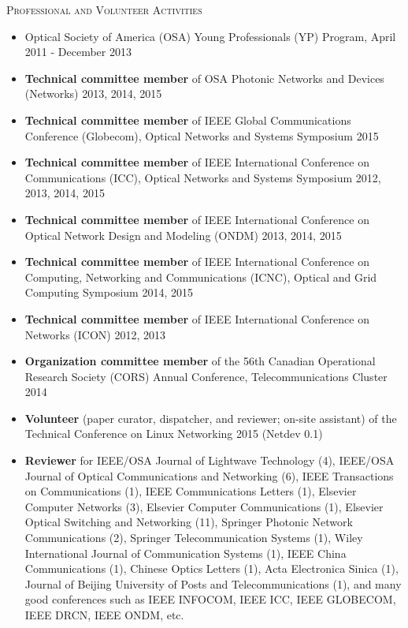 \documentclass[letterpaper,11pt]{article}
\newcommand{\resheading}[1]{{\noindent\large \colorbox{mygrey}{
\begin{minipage}{1.0\textwidth}{\textsc{#1 \vphantom{p\^{E}}}}\end{minipage}}}}
\begin{document}
\resheading{Professional and Volunteer Activities}%
\begin{itemize}
\setlength{\itemindent}{-0.075in}


\item
Optical Society of America (OSA) Young Professionals (YP) Program, April 2011 - December 2013

\item
\textbf{Technical committee member} of OSA Photonic Networks and Devices (Networks) 2013, 2014, 2015

\item
\textbf{Technical committee member} of IEEE Global Communications Conference (Globecom), Optical Networks and Systems Symposium 2015

\item
\textbf{Technical committee member} of IEEE International Conference on Communications (ICC), Optical Networks and Systems Symposium 2012, 2013, 2014, 2015

\item
\textbf{Technical committee member} of IEEE International Conference on Optical Network Design and Modeling (ONDM) 2013, 2014, 2015

\item
\textbf{Technical committee member} of IEEE International Conference on Computing, Networking and Communications (ICNC), Optical and Grid Computing Symposium 2014, 2015

\item
\textbf{Technical committee member} of IEEE International Conference on Networks (ICON) 2012, 2013

\item
\textbf{Organization committee member} of the 56th Canadian Operational Research Society (CORS) Annual Conference, Telecommunications Cluster 2014

\item
\textbf{Volunteer} (paper curator, dispatcher, and reviewer; on-site assistant) of the Technical Conference on Linux Networking 2015 (Netdev 0.1)

\item
\textbf{Reviewer} for IEEE/OSA Journal of Lightwave Technology (4), IEEE/OSA Journal of Optical Communications and Networking (6), IEEE Transactions on Communications (1), IEEE Communications Letters (1), Elsevier Computer Networks (3), Elsevier Computer Communications (1), Elsevier Optical Switching and Networking (11), Springer Photonic Network Communications (2), Springer Telecommunication Systems (1), Wiley International Journal of Communication Systems (1), IEEE China Communications (1), Chinese Optics Letters (1), Acta Electronica Sinica (1), Journal of Beijing University of Posts and Telecommunications (1), and many good conferences such as IEEE INFOCOM, IEEE ICC, IEEE GLOBECOM, IEEE DRCN, IEEE ONDM, etc.

\end{itemize}
\end{document}
